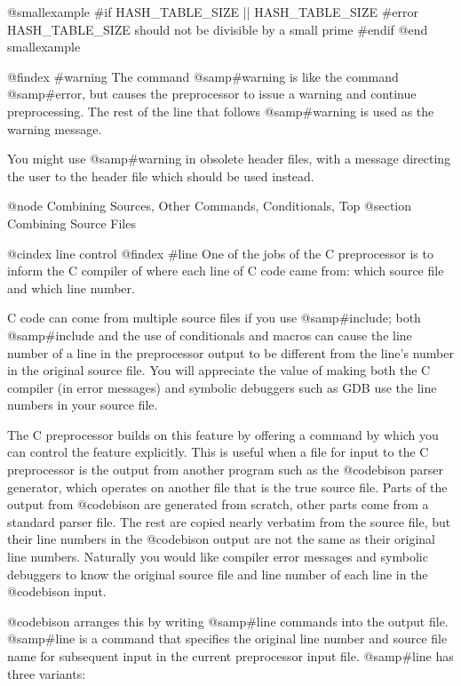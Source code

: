 {{@smallexample
#if HASH_TABLE_SIZE %
    || HASH_TABLE_SIZE %
#error HASH_TABLE_SIZE should not be divisible by a small prime
#endif
@end smallexample

@findex #warning
The command @samp{#warning} is like the command @samp{#error}, but causes
the preprocessor to issue a warning and continue preprocessing.  The rest of
the line that follows @samp{#warning} is used as the warning message.

You might use @samp{#warning} in obsolete header files, with a message
directing the user to the header file which should be used instead.

@node Combining Sources, Other Commands, Conditionals, Top
@section Combining Source Files

@cindex line control
@findex #line
One of the jobs of the C preprocessor is to inform the C compiler of where
each line of C code came from: which source file and which line number.

C code can come from multiple source files if you use @samp{#include};
both @samp{#include} and the use of conditionals and macros can cause
the line number of a line in the preprocessor output to be different
from the line's number in the original source file.  You will appreciate
the value of making both the C compiler (in error messages) and symbolic
debuggers such as GDB use the line numbers in your source file.

The C preprocessor builds on this feature by offering a command by which
you can control the feature explicitly.  This is useful when a file for
input to the C preprocessor is the output from another program such as the
@code{bison} parser generator, which operates on another file that is the
true source file.  Parts of the output from @code{bison} are generated from
scratch, other parts come from a standard parser file.  The rest are copied
nearly verbatim from the source file, but their line numbers in the
@code{bison} output are not the same as their original line numbers.
Naturally you would like compiler error messages and symbolic debuggers to
know the original source file and line number of each line in the
@code{bison} input.

@code{bison} arranges this by writing @samp{#line} commands into the output
file.  @samp{#line} is a command that specifies the original line number
and source file name for subsequent input in the current preprocessor input
file.  @samp{#line} has three variants:

}}
